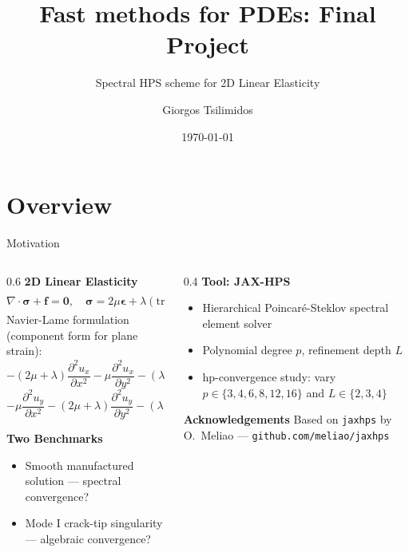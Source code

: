 \documentclass[9pt,compress,t,aspectratio=169]{beamer}
\title{Fast methods for PDEs: Final Project}
\subtitle{Spectral HPS scheme for 2D Linear Elasticity}
\author{Giorgos Tsilimidos}
\date{\today}
\begin{document}
\titleframe{}

\section{Overview}

\begin{frame}{Motivation}
\begin{columns}[T]
\begin{column}{0.6\textwidth}
\textbf{2D Linear Elasticity}
\[
\nabla \cdot \boldsymbol{\sigma} + \mathbf{f} = \mathbf{0}, \quad \boldsymbol{\sigma} = 2\mu\boldsymbol{\epsilon} + \lambda(\mathrm{tr}\,\boldsymbol{\epsilon})\mathbf{I}, \quad
\boldsymbol{\epsilon} = \frac{1}{2}(\nabla \mathbf{u} + \nabla \mathbf{u}^T)
\]
Navier-Lame formulation (component form for plane strain):
\[
-(2\mu+\lambda)\frac{\partial^2 u_x}{\partial x^2} - \mu\frac{\partial^2 u_x}{\partial y^2} - (\lambda+\mu)\frac{\partial^2 u_y}{\partial x \partial y} = f_x
\]
\[
-\mu\frac{\partial^2 u_y}{\partial x^2} - (2\mu+\lambda)\frac{\partial^2 u_y}{\partial y^2} - (\lambda+\mu)\frac{\partial^2 u_x}{\partial x \partial y} = f_y
\]

\vspace{0.3cm}
\textbf{Two Benchmarks}
\begin{itemize}
  \item Smooth manufactured solution — spectral convergence?
  \item Mode I crack-tip singularity — algebraic convergence?
\end{itemize}
\end{column}
\begin{column}{0.4\textwidth}
\textbf{Tool: JAX-HPS}
\begin{itemize}
  \item Hierarchical Poincaré-Steklov spectral element solver
  \item Polynomial degree $p$, refinement depth $L$
  \item hp-convergence study: vary $p \in \{3,4,6,8,12,16\}$ and $L \in \{2,3,4\}$
\end{itemize}

\vspace{0.3cm}
\textbf{Acknowledgements}
Based on \texttt{jaxhps} by O.~Meliao — \texttt{github.com/meliao/jaxhps}

\end{column}
\end{columns}
\end{frame}
\end{document}
